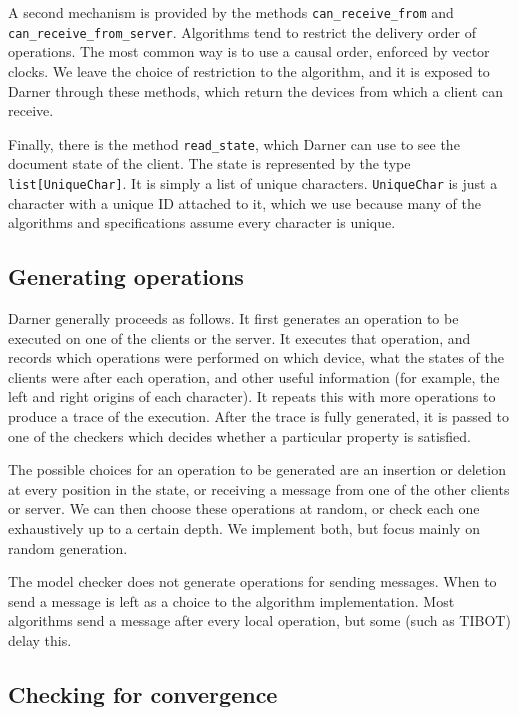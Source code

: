 \documentclass[sigplan,10pt,review,anonymous]{acmart}
\begin{document}
A second mechanism is provided by the methods \texttt{can\_receive\_from} and \texttt{can\_receive\_from\_server}. Algorithms tend to restrict the delivery order of operations. The most common way is to use a causal order, enforced by vector clocks. We leave the choice of restriction to the algorithm, and it is exposed to Darner through these methods, which return the devices from which a client can receive.

Finally, there is the method \texttt{read\_state}, which Darner can use to see the document state of the client. The state is represented by the type 
\texttt{list[UniqueChar]}. It is simply a list of unique characters. \texttt{UniqueChar} is just a character with a unique ID attached to it, which we use because many 
of the algorithms and specifications assume every character is unique.

\subsection{Generating operations}

Darner generally proceeds as follows. It first generates an operation to be executed on one of the clients or the server. It executes that operation, and records which operations were performed on which device, what the states of the clients were after each operation, and other useful information (for example, the left and right origins of each character). It repeats this with more operations to produce a trace of the execution. After the trace is fully generated, it is passed to one of the checkers which decides whether a particular property is satisfied.

The possible choices for an operation to be generated are an insertion or deletion at every position in the state, or receiving a message
from one of the other clients or server. We can then choose these operations at random, or check each one exhaustively up to a certain depth.
We implement both, but focus mainly on random generation.

The model checker does not generate operations for sending messages. When to send a message is left as a choice to the algorithm implementation. Most algorithms send a message after every local operation, but some (such as TIBOT) delay this.

\subsection{Checking for convergence}
\end{document}
